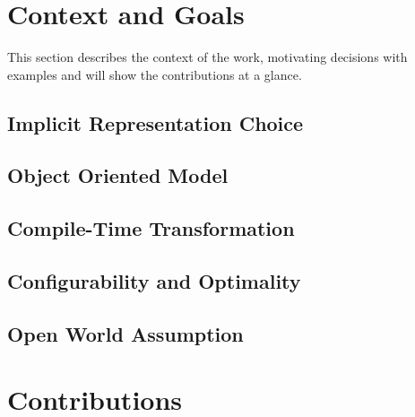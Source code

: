 
\cite{st-amour-opt-coaching}

\section{Context and Goals}

This section describes the context of the work, motivating decisions with examples and will show the contributions at a glance.

\subsection{Implicit Representation Choice}


\subsection{Object Oriented Model}





\subsection{Compile-Time Transformation}

\subsection{Configurability and Optimality}

\subsection{Open World Assumption}


\section{Contributions}
